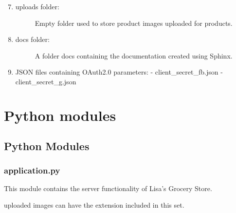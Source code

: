 \documentclass[letterpaper,10pt,english]{sphinxmanual}
\begin{document}
\begin{DUlineblock}{0em}
\item[] 
\end{DUlineblock}
\begin{enumerate}
\setcounter{enumi}{6}
\item {} \begin{description}
\item[{uploads folder:}] \leavevmode
Empty folder used to store product images uploaded for products.

\end{description}

\item {} \begin{description}
\item[{docs folder:}] \leavevmode
A folder docs containing the documentation created using Sphinx.

\end{description}

\item {} 
JSON files containing OAuth2.0 parameters:
- client\_secret\_fb.json
- client\_secret\_g.json

\end{enumerate}


\chapter{Python modules}
\label{index:python-modules}

\section{Python Modules}
\label{modules:python-modules}\label{modules::doc}

\subsection{application.py}
\label{application:application-py}\label{application::doc}\label{application:module-application}
This module contains the server functionality of Lisa's Grocery Store.

\begin{fulllineitems}
\label{application:application.ALLOWED_EXTENSIONS}
uploaded images can have the extension included in this set.

\end{fulllineitems}
\end{document}
